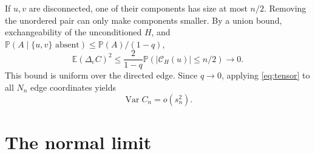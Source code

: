 \documentclass[11pt]{article}
\newcommand{\E}{\mathbb E}
\newcommand{\Var}{\operatorname{Var}}
\begin{document}
If $u,v$ are disconnected, one of their components has size at most $n/2$. Removing the unordered pair can only make components smaller. By a union bound, exchangeability of the unconditioned $H$, and
$\mathbb P(A\mid\{u,v\}\text{ absent})\le\mathbb P(A)/(1-q)$,
\begin{equation}\label{eq:component-increment}
 \E(\Delta_e C)^2
 \le\frac{2}{1-q}\mathbb P(|\mathcal C_H(u)|\le n/2)
 \longrightarrow0.
\end{equation}
This bound is uniform over the directed edge. Since $q\to0$, applying \eqref{eq:tensor} to all $N_n$ edge coordinates yields
\begin{equation}\label{eq:component-var}
 \Var C_n=o(s_n^2).
\end{equation}

\section{The normal limit}
\end{document}
